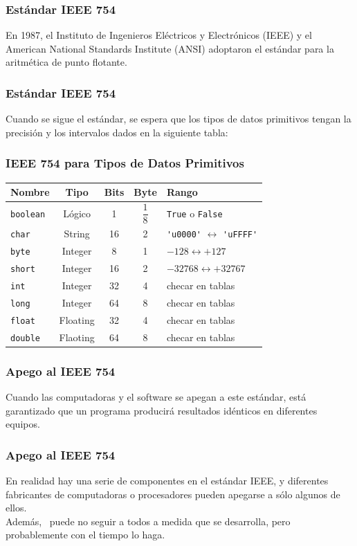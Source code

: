 \documentclass[12pt]{beamer}
\begin{document}
\begin{frame}
\frametitle{Estándar IEEE 754}
En 1987, el Instituto de Ingenieros Eléctricos y Electrónicos (IEEE) y el American National Standards Institute (ANSI) adoptaron el estándar  para la aritmética de punto flotante.
\end{frame}
\begin{frame}
\frametitle{Estándar IEEE 754}
Cuando se sigue el estándar, se espera que los tipos de datos primitivos tengan la precisión y los intervalos dados en la siguiente tabla:
\end{frame}
\begin{frame}[fragile]
\frametitle{IEEE 754 para Tipos de Datos Primitivos}
\begin{table}
\fontsize{10}{10}\selectfont
\begin{tabular}{l c c c l}
\hline
Nombre & Tipo & Bits & Byte & Rango \\ \hline
\texttt{boolean} & Lógico & 1 & $\dfrac{1}{8}$ & \texttt{True} o \texttt{False} \\ \hline
\texttt{char} & String & 16 & 2 & \verb|'u0000'| $\longleftrightarrow$ \verb|'uFFFF'| \\ \hline
\texttt{byte} & Integer & 8 & 1 & $-128 \longleftrightarrow +127$ \\ \hline
\texttt{short} & Integer & 16 & 2 & $-32768 \longleftrightarrow +32767$ \\ \hline
\texttt{int} & Integer & 32 & 4 & checar en tablas \\ \hline
\texttt{long} & Integer & 64 & 8 & checar en tablas \\ \hline
\texttt{float} & Floating & 32 & 4 & checar en tablas \\ \hline
\texttt{double} & Flaoting & 64 & 8 & checar en tablas \\ \hline
\end{tabular}
\end{table}
\end{frame}
\begin{frame}
\frametitle{Apego al IEEE 754}
 Cuando las computadoras y el software se apegan a este estándar, está garantizado que un programa producirá resultados idénticos en diferentes equipos.
 \end{frame}
 \begin{frame}
 \frametitle{Apego al IEEE 754}
 En realidad hay una serie de componentes en el estándar IEEE, y diferentes fabricantes de computadoras o procesadores pueden apegarse a sólo algunos de ellos.
 \\
 \bigskip
 \pause
 Además, \python\ puede no seguir a todos a medida que se desarrolla, pero probablemente con el tiempo lo haga.
 \end{frame}
\end{document}

